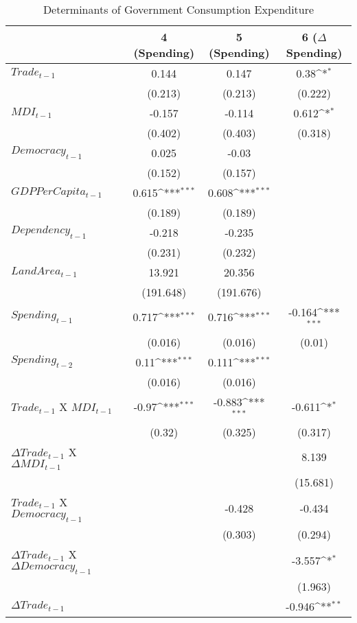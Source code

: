 \def\sym#1{\ifmmode^{#1}\else\(^{#1}\)\fi}
\begin{table}[htbp]
\caption {Determinants of Government Consumption Expenditure} \label{tab:title} 
\centering
\footnotesize
\begin{tabular}{l*{3}{c}}
\hline\hline
  &\multicolumn{1}{c}{4 (Spending)} &\multicolumn{1}{c}{5 (Spending)} &\multicolumn{1}{c}{6 ($\Delta$Spending)} \\
\hline
$Trade_{t-1}$		&0.144 		&0.147 		&0.38\sym{*}\\
  		&(0.213) 		&(0.213) 		&(0.222) \\
$MDI_{t-1}$ 		&-0.157 		&-0.114 		&0.612\sym{*} \\
  		&(0.402) 		&(0.403) 		&(0.318) \\
$Democracy_{t-1}$		&0.025 		&-0.03 		& \\
  		&(0.152) 		&(0.157) 		& \\
$GDP Per Capita_{t-1}$ 		&0.615\sym{***} 		&0.608\sym{***} 		& \\
  		&(0.189) 		&(0.189) 		& \\
$Dependency_{t-1}$		&-0.218 		&-0.235 		& \\
  		&(0.231) 		&(0.232) 		& \\
$Land Area_{t-1}$	 		&13.921 		&20.356 		& \\
  		&(191.648) 		&(191.676) 		& \\
$Spending_{t-1}$ 		&0.717\sym{***} 		&0.716\sym{***} 		&-0.164\sym{***} \\
  		&(0.016) 		&(0.016) 		&(0.01) \\
$Spending_{t-2}$ 		&0.11\sym{***} 		&0.111\sym{***} 		& \\
  		&(0.016) 		&(0.016) 		& \\
$Trade_{t-1}$ X $MDI_{t-1}$  		&-0.97\sym{***} 		&-0.883\sym{***} 		&-0.611\sym{*} \\
  		&(0.32) 		&(0.325) 		&(0.317) \\
$\Delta Trade_{t-1}$ X $\Delta MDI_{t-1}$ 		& 		& 		&8.139 \\
  		& 		& 		&(15.681) \\
$Trade_{t-1}$ X $Democracy_{t-1}$ 		& 		&-0.428 		&-0.434 \\
  		& 		&(0.303) 		&(0.294) \\
$\Delta Trade_{t-1}$ X $\Delta Democracy_{t-1}$ 		& 		& 		&-3.557\sym{*} \\
  		& 		& 		&(1.963) \\
$\Delta Trade_{t-1}$ 	 		& 		& 		&-0.946\sym{**} \\

\end{tabular}
\end{table}
